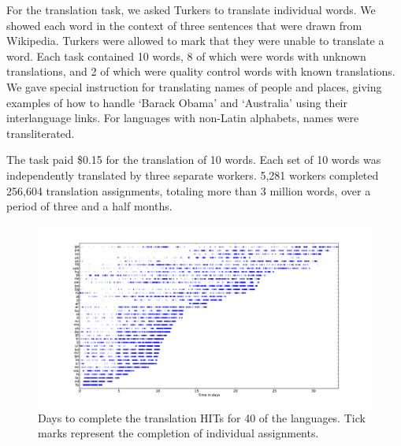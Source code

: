 \documentclass[11pt]{article}
\begin{document}
For the translation task, we asked Turkers to translate individual words.  We showed each word in the context of three sentences that were drawn from Wikipedia.  
Turkers were allowed to mark that they were unable to translate a word. Each task contained 10 words, 8 of which were words with unknown translations, and 2 of which were quality control words with known translations.   
We gave special instruction for translating names of people and places, giving examples of how to handle `Barack Obama' and `Australia' using their interlanguage links. For languages with non-Latin alphabets, names were transliterated. 

The task paid \$0.15 for the translation of 10 words.  
Each set of 10 words was independently translated by three separate workers.  5,281 workers completed 256,604 translation assignments, totaling more than 3 million words, over a period of three and a half months.


\begin{figure}[h]
\includegraphics[height=\linewidth,angle=270]{figures/completetime}
\caption{Days to complete the translation HITs for 40 of the languages. Tick marks represent the completion of individual assignments. }
\label{completion-time}
\end{figure}
\end{document}
